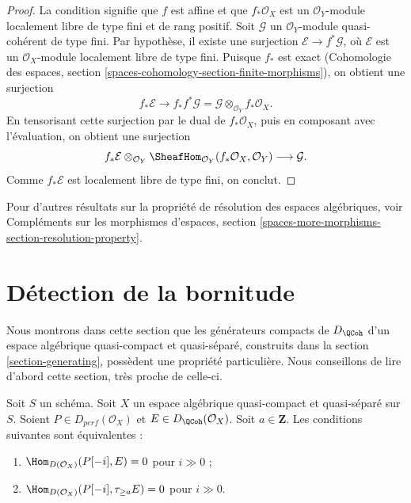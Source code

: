 \begin{proof}
La condition signifie que $f$ est affine et que $f_*\mathcal{O}_X$ est un
$\mathcal{O}_Y$-module localement libre de type fini et de rang positif.
Soit $\mathcal{G}$ un $\mathcal{O}_Y$-module quasi-coh\'erent de type fini.
Par hypoth\`ese, il existe une surjection
$\mathcal{E}\to f^*\mathcal{G}$, o\`u $\mathcal{E}$ est un
$\mathcal{O}_X$-module localement libre de type fini. Puisque $f_*$ est exact
(Cohomologie des espaces, section
\ref{spaces-cohomology-section-finite-morphisms}), on obtient une surjection
$$
f_*\mathcal{E}
\longrightarrow
f_*f^*\mathcal{G} = \mathcal{G} \otimes_{\mathcal{O}_Y} f_*\mathcal{O}_X.
$$
En tensorisant cette surjection par le dual de $f_*\mathcal{O}_X$, puis en composant avec l'évaluation, on obtient une surjection
$$
f_*\mathcal{E}
\otimes_{\mathcal{O}_Y}
\SheafHom_{\mathcal{O}_Y}(f_*\mathcal{O}_X, \mathcal{O}_Y)
\longrightarrow
\mathcal{G}.
$$
Comme $f_*\mathcal{E}$ est localement libre de type fini, on conclut.
\end{proof}

\noindent
Pour d'autres r\'esultats sur la propri\'et\'e de r\'esolution des espaces
alg\'ebriques, voir Compl\'ements sur les morphismes d'espaces, section
\ref{spaces-more-morphisms-section-resolution-property}.












\section{D\'etection de la bornitude}
\label{section-detecting-boundedness}

\noindent
Nous montrons dans cette section que les g\'en\'erateurs compacts de $D_\QCoh$
d'un espace alg\'ebrique quasi-compact et quasi-s\'epar\'e, construits dans la
section \ref{section-generating}, poss\`edent une propri\'et\'e particuli\`ere.
Nous conseillons de lire d'abord cette section, tr\`es proche de celle-ci.

\begin{lemma}
\label{lemma-bounded-truncation}
Soit $S$ un sch\'ema.
Soit $X$ un espace alg\'ebrique quasi-compact et quasi-s\'epar\'e sur $S$.
Soient $P\in D_{perf}(\mathcal{O}_X)$ et
$E\in D_{\QCoh}(\mathcal{O}_X)$. Soit $a\in\mathbf{Z}$.
Les conditions suivantes sont \'equivalentes :
\begin{enumerate}
\item $\Hom_{D(\mathcal{O}_X)}(P[-i],E)=0$ pour $i\gg0$ ;
\item $\Hom_{D(\mathcal{O}_X)}(P[-i],\tau_{\geq a}E)=0$ pour $i\gg0$.
\end{enumerate}
\end{lemma}

